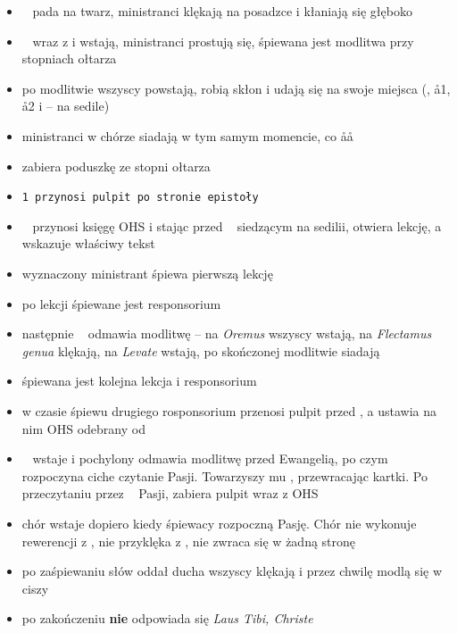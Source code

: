 \begin{itemize}
      \item \ii~ pada na twarz, ministranci klękają na posadzce i kłaniają się
            głęboko
      \item \ii~ wraz z  i  wstają, ministranci prostują się, śpiewana
            jest modlitwa przy stopniach ołtarza
      \item po modlitwie wszyscy powstają, robią skłon i udają się na swoje
            miejsca (\ii, \aa1, \aa2 i  -- na sedile)
      \item ministranci w chórze siadają w tym samym momencie, co \aa\aa
      \item {} zabiera poduszkę ze stopni ołtarza
      \item \tt1 przynosi pulpit po stronie epistoły
      \item \bb~ przynosi księgę OHS i stając przed \ii~ siedzącym na sedilii,
            otwiera lekcję, a  wskazuje właściwy tekst
      \item wyznaczony ministrant śpiewa pierwszą lekcję
      \item po lekcji śpiewane jest responsorium
      \item następnie \ii~ odmawia modlitwę – na \textit{Oremus} wszyscy wstają,
            na \textit{Flectamus genua} klękają, na \textit{Levate} wstają, po
            skończonej modlitwie siadają
      \item śpiewana jest kolejna lekcja i responsorium
      \item w czasie śpiewu drugiego rosponsorium  przenosi pulpit przed
            \ii, a  ustawia na nim OHS odebrany od \bb
      \item \ii~ wstaje i pochylony odmawia modlitwę przed Ewangelią, po czym
            rozpoczyna ciche czytanie Pasji. Towarzyszy mu , przewracając
            kartki. Po przeczytaniu przez \ii~ Pasji,  zabiera pulpit wraz z OHS
      \item chór wstaje dopiero kiedy śpiewacy rozpoczną Pasję. Chór nie
            wykonuje rewerencji z \ii, nie przyklęka z \ii, nie zwraca się w
            żadną stronę
      \item po zaśpiewaniu słów oddał ducha wszyscy klękają i przez chwilę modlą
            się w ciszy
      \item po zakończeniu \textbf{nie} odpowiada się \textit{Laus Tibi, Christe}
\end{itemize}